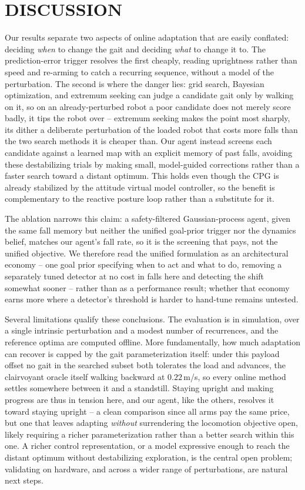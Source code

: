 \documentclass[letterpaper, 10 pt, conference]{ieeeconf}  %
\begin{document}
\section{DISCUSSION}

Our results separate two aspects of online adaptation that are easily conflated: deciding \emph{when} to change the gait and deciding \emph{what} to change it to.
The prediction-error trigger resolves the first cheaply, reading uprightness rather than speed and re-arming to catch a recurring sequence, without a model of the perturbation.
The second is where the danger lies: grid search, Bayesian optimization, and extremum seeking can judge a candidate gait only by walking on it, so on an already-perturbed robot a poor candidate does not merely score badly, it tips the robot over -- extremum seeking makes the point most sharply, its dither a deliberate perturbation of the loaded robot that costs more falls than the two search methods it is cheaper than.
Our agent instead screens each candidate against a learned map with an explicit memory of past falls, avoiding these destabilizing trials by making small, model-guided corrections rather than a faster search toward a distant optimum.
This holds even though the CPG is already stabilized by the attitude virtual model controller, so the benefit is complementary to the reactive posture loop rather than a substitute for it.

The ablation narrows this claim: a safety-filtered Gaussian-process agent, given the same fall memory but neither the unified goal-prior trigger nor the dynamics belief, matches our agent's fall rate, so it is the screening that pays, not the unified objective.
We therefore read the unified formulation as an architectural economy -- one goal prior specifying when to act and what to do, removing a separately tuned detector at no cost in falls here and detecting the shift somewhat sooner -- rather than as a performance result; whether that economy earns more where a detector's threshold is harder to hand-tune remains untested.

Several limitations qualify these conclusions.
The evaluation is in simulation, over a single intrinsic perturbation and a modest number of recurrences, and the reference optima are computed offline.
More fundamentally, how much adaptation can recover is capped by the gait parameterization itself: under this payload offset no gait in the searched subset both tolerates the load and advances, the clairvoyant oracle itself walking backward at $0.22$\,m/s, so every online method settles somewhere between it and a standstill.
Staying upright and making progress are thus in tension here, and our agent, like the others, resolves it toward staying upright -- a clean comparison since all arms pay the same price, but one that leaves adapting \emph{without} surrendering the locomotion objective open, likely requiring a richer parameterization rather than a better search within this one.
A richer control representation, or a model expressive enough to reach the distant optimum without destabilizing exploration, is the central open problem; validating on hardware, and across a wider range of perturbations, are natural next steps.
\end{document}
